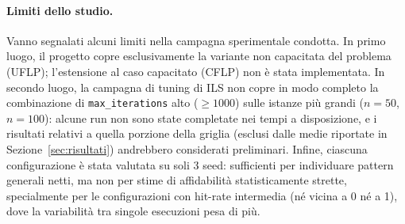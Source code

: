 \documentclass[11pt,a4paper]{article}
\begin{document}
\paragraph{Limiti dello studio.} Vanno segnalati alcuni limiti nella
campagna sperimentale condotta. In primo luogo, il progetto copre
esclusivamente la variante non capacitata del problema (UFLP); l'estensione
al caso capacitato (CFLP) non è stata implementata.
In secondo luogo, la campagna di tuning di ILS non copre in modo completo la
combinazione di \texttt{max\_iterations} alto ($\geq 1000$) sulle istanze più
grandi ($n=50$, $n=100$): alcune run non sono state completate nei tempi a
disposizione, e i risultati relativi a quella porzione della griglia (esclusi
dalle medie riportate in Sezione~\ref{sec:risultati}) andrebbero considerati
preliminari. Infine, ciascuna configurazione è stata valutata su soli 3 seed:
sufficienti per individuare pattern generali netti, ma non per stime di
affidabilità statisticamente strette, specialmente per le configurazioni con
hit-rate intermedia (né vicina a 0 né a 1), dove la variabilità tra singole
esecuzioni pesa di più.
\end{document}

